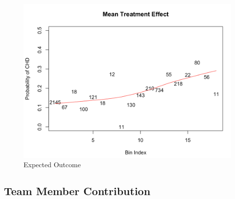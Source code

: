 \documentclass[]{article}
\begin{document}
\begin{figure}[h]

{\centering \includegraphics[width=0.5\linewidth]{./pos_violation2} 

}

\caption{Expected Outcome}\label{fig:fig3}
\end{figure}

\newpage

\hypertarget{team-member-contribution}{%
\subsection{Team Member Contribution}\label{team-member-contribution}}
\end{document}

